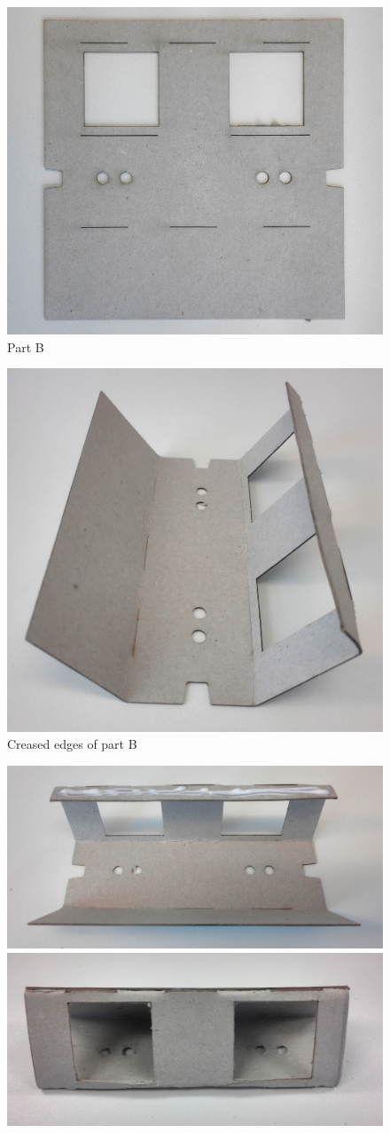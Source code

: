 \documentclass[../../Cardboard_Assembling]{subfiles}
\begin{document}
\begin{enumerate}
	\begin{figure}[htb]
		\centering
		\includegraphics[width=0.8\linewidth]{partB01}
		\caption{Part B}
		\label{fig:screenshot006}
	\end{figure}
	\begin{figure}[htb]
		\centering
		\includegraphics[width=0.5\linewidth]{partB02}
		\caption{Creased edges of part B}
		\label{fig:screenshot007}
	\end{figure}
	\begin{figure}[htb]
		\centering
		\includegraphics[width=0.6\linewidth]{partB03}\\ \vspace{2mm}
		\includegraphics[width=0.6\linewidth]{partB04}

\end{figure}
\end{enumerate}
\end{document}
